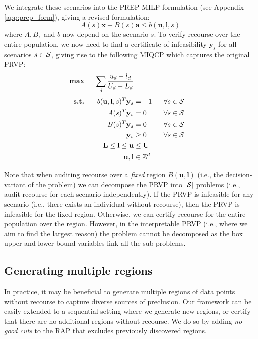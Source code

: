 We integrate these scenarios into the PREP MILP formulation (see Appendix \ref{app:prep_form}), giving a revised formulation:
$$
A(s)\mathbf{x} + B(s)\mathbf{a} \leq b(\mathbf{u}, \mathbf{l},s)
$$
where $A, B,$ and $b$ now depend on the scenario $s$. To verify recourse over the entire population, we now need to find a certificate of infeasibility $\mathbf{y}_s$ for all scenarios $s \in {\cal S}$, giving rise to the following MIQCP which captures the original PRVP:
\begin{align}
	\textbf{max}~~&& \sum_d \frac{u_d - l_d}{U_d - L_d} \label{obj:f_size}\\[.1cm]
	\textbf{s.t.}~~&& b(\mathbf{u}, \mathbf{l}, s)^T \mathbf{y}_s &= -1 ~~&& \forall s \in {\cal S} \label{const:f_neg_ray}\\
	&& A(s)^T \mathbf{y}_s &= 0 && \forall s \in {\cal S} \label{const:f_dual_feas_a} \\
	&& B(s)^T \mathbf{y}_s &= 0 && \forall s \in {\cal S}\label{const:f_dual_feas_b} \\
	&& \mathbf{y}_s &\geq 0 && \forall s \in {\cal S}\label{const:f_non_neg_y} \\
	&& \mathbf{L} \leq \mathbf{l} \leq \mathbf{u} &\leq \mathbf{U} && \label{const:f_box_bounds} \\
	&& \mathbf{u}, \mathbf{l} &\in \mathbb{Z}^d \label{const:f_ul_int}
\end{align}

Note that when auditing recourse over a \emph{fixed} region $B(\mathbf{u}, \mathbf{l})$ (i.e., the decision-variant of the problem) we can decompose the PRVP into $|{\cal S}|$ problems (i.e., audit recourse for each scenario independently). If the PRVP is infeasible for any scenario (i.e., there exists an individual without recourse), then the PRVP is infeasible for the fixed region. Otherwise, we can certify recourse for the entire population over the region. However, in the interpretable PRVP (i.e., where we aim to find the largest reason) the problem cannot be decomposed as the box upper and lower bound variables link all the sub-problems. 



\subsection{Generating multiple regions}
In practice, it may be beneficial to generate multiple regions of data points without recourse to capture diverse sources of preclusion. Our framework can be easily extended to a sequential setting where we generate new regions, or certify that there are no additional regions without recourse. We do so by adding \textit{no-good cuts} to the RAP that excludes previously discovered regions.

